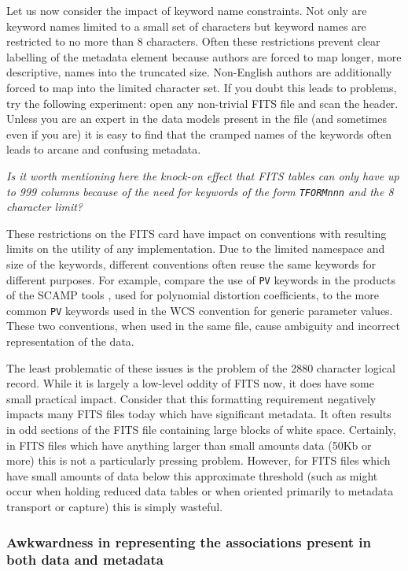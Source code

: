 \documentclass[final,authoryear,5p,times,twocolumn]{elsarticle}
\begin{document}
{{Let us now consider the impact of keyword name constraints. Not only
are keyword names limited to a small set of characters but keyword
names are restricted to no more than 8 characters. Often these
restrictions prevent clear labelling of the metadata element because
authors are forced to map longer, more descriptive, names into the
truncated size. Non-English authors are additionally forced to map
into the limited character set. If you doubt this leads to problems,
try the following experiment: open any non-trivial FITS file and scan
the header. Unless you are an expert in the data models present in the
file (and sometimes even if you are) it is easy to find that the
cramped names of the keywords often leads to arcane and confusing
metadata.

\textit{\color{red} Is it worth mentioning here the knock-on effect that FITS
tables can only have up to 999 columns because of the need for keywords of the
form \texttt{TFORMnnn} and the 8 character limit?}

These restrictions on the FITS card have impact on conventions with
resulting limits on the utility of any implementation. Due to the limited 
namespace and size of the keywords, different conventions often reuse 
the same keywords for different purposes.  For example, compare the use 
of \texttt{PV} keywords in the products of the SCAMP tools
\citep{2006ASPC..351..112B}, used for polynomial distortion coefficients, 
to the more common \texttt{PV} keywords used in the WCS convention for generic
parameter values. These two conventions, when used in the same file,
cause ambiguity and incorrect representation of the data.


The least problematic of these issues is the problem of the 2880
character logical record. While
it is largely a low-level oddity of FITS now, it does have some small
practical impact. Consider that this formatting requirement negatively
impacts many FITS files today which have significant metadata. It
often results in odd sections of the FITS file containing large blocks
of white space. Certainly, in FITS files which have anything larger than
small amounts data (50Kb or more) this is not a particularly pressing
problem. However, for FITS files which have small amounts of data
below this approximate threshold (such as might occur when holding 
reduced data tables or when oriented primarily to metadata transport or 
capture) this is simply wasteful.


\subsubsection{Awkwardness in representing the associations present in both data and metadata}
\label{section_associations}


}}
\end{document}
